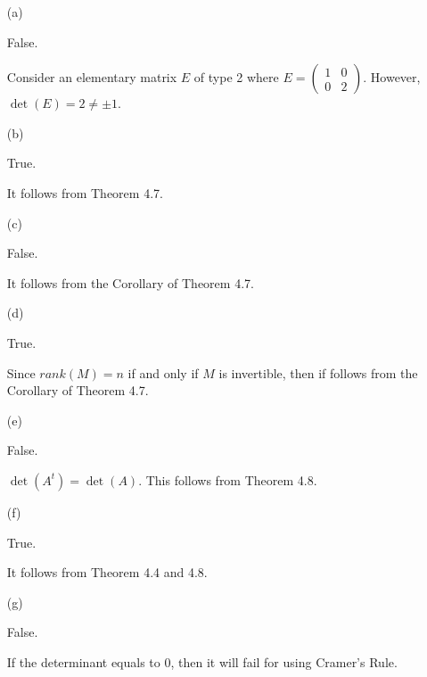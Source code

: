 \begin{Exercise}
\begin{enumerate}[(a)]
\item[(a)]
\begin{answer}
False.
\end{answer}
\begin{solution}
Consider an elementary matrix $E$ of type 2 where $E = \begin{pmatrix}
1 & 0 \\
0 & 2 
\end{pmatrix}$. However, $\det(E) = 2 \neq \pm 1$.
\end{solution}

\item[(b)]
\begin{answer}
True.
\end{answer}
\begin{solution}
It follows from Theorem 4.7.
\end{solution}

\item[(c)]
\begin{answer}
False.
\end{answer}
\begin{solution}
It follows from the Corollary of Theorem 4.7.
\end{solution}

\item[(d)]
\begin{answer}
True.
\end{answer}
\begin{solution}
Since $rank(M) = n$ if and only if $M$ is invertible, then if follows from the Corollary of Theorem 4.7.
\end{solution}

\item[(e)]
\begin{answer}
False.
\end{answer}
\begin{solution}
$\det(A^t) = \det(A)$. This follows from Theorem 4.8.
\end{solution}

\item[(f)]
\begin{answer}
True.
\end{answer}
\begin{solution}
It follows from Theorem 4.4 and 4.8.
\end{solution}

\item[(g)]
\begin{answer}
False.
\end{answer}
\begin{solution}
If the determinant equals to $0$, then it will fail for using Cramer's Rule.
\end{solution}


\end{enumerate}
\end{Exercise}
